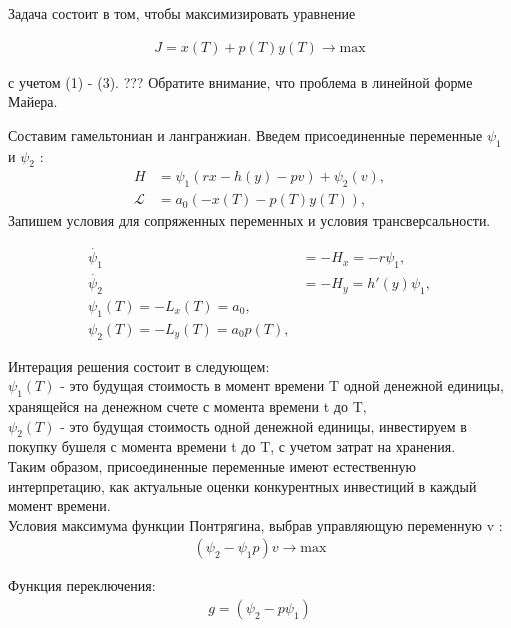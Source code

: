 Задача состоит в том, чтобы максимизировать уравнение

\begin{align}
    J = x(T) + p(T) y(T)\to \mathrm{max}
\end{align} 

с учетом (1) - (3). ??? Обратите внимание, что проблема в линейной форме Майера.


Составим гамельтониан и лангранжиан. Введем присоединенные переменные $ \psi_1 $  и $ \psi_2 $ :
\begin{align}
    {H} & = \psi_{1} (r x - h(y) - p v) + \psi_{2} (v),\\
    \mathcal{L} & = a_{0} (-x(T) - p(T) y(T)),
\end{align} 
Запишем условия для сопряженных переменных и условия трансверсальности.

\begin{align}
    \Dot{\psi_{1}} & = -H_x = -r \psi_{1},\\
    \Dot{\psi_{2}} & = -H_y = h'(y) \psi_{1},\\
    {\psi_{1}(T)} = - {L}_x(T)=a_{0},\\
    {\psi_{2}(T)} = - {L}_y(T)=a_{0} p(T),
\end{align} 

Интерация решения состоит в следующем:\\
 $ \psi_1(T) $ - это будущая стоимость в момент времени {T} одной денежной единицы, хранящейся на денежном счете с момента времени {t} до {T},\\
 $ \psi_2(T) $ - это будущая стоимость одной денежной единицы, инвестируем в покупку бушеля с момента времени {t} до {T}, с учетом затрат на хранения.\\
 Таким образом, присоединенные переменные имеют естественную интерпретацию, как актуальные оценки конкурентных инвестиций в каждый момент времени.\\ 

Условия максимума функции Понтрягина, выбрав управляющую переменную {v} : \\
\begin{align}
    (\psi_{2} - \psi_{1} p)v\to \mathrm{max}
\end{align} 

Функция переключения:
\begin{align}
g = (\psi_{2} - p \psi_{1})
\end{align} 



